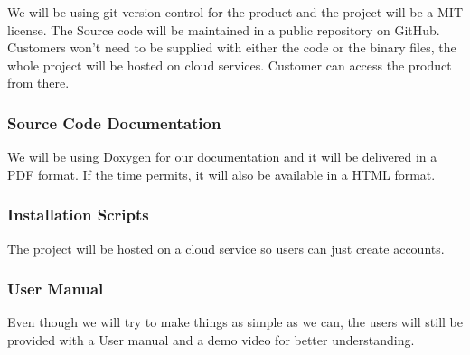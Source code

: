 We will be using git version control for the product and the project will be a MIT license.
The Source code will be maintained in a public repository on GitHub. Customers won't need to be supplied with either the code or the binary files, the whole project will be hosted on cloud services. Customer can access the product from there.

\subsubsection{Source Code Documentation}
We will be using Doxygen for our documentation and it will be delivered in a PDF format. If the time permits, it will also be available in a HTML format.
\subsubsection{Installation Scripts}
The project will be hosted on a cloud service so users can just create accounts.
\subsubsection{User Manual}
Even though we will try to make things as simple as we can, the users will still be provided with a User manual and a demo video for better understanding.

